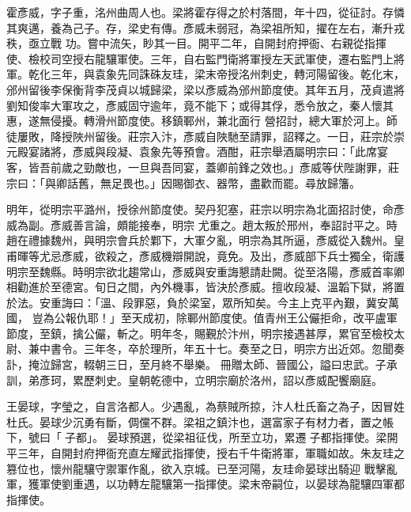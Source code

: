 
\begin{pinyinscope}

 霍彥威，字子重，洺州曲周人也。梁將霍存得之於村落間，年十四，從征討。存憐其爽邁，養為己子。存，梁史有傳。彥威未弱冠，為梁祖所知，擢在左右，漸升戎秩，亟立戰
 功。嘗中流矢，眇其一目。開平二年，自開封府押衙、右親從指揮使、檢校司空授右龍驤軍使。三年，自右監門衛將軍授左天武軍使，遷右監門上將軍。乾化三年，與袁象先同誅硃友珪，梁末帝授洺州刺史，轉河陽留後。乾化末，邠州留後李保衡背李茂貞以城歸梁，梁以彥威為邠州節度使。其年五月，茂貞遣將劉知俊率大軍攻之，彥威固守逾年，竟不能下；或得其俘，悉令放之，秦人懷其惠，遂無侵擾。轉滑州節度使。移鎮鄆州，兼北面行
 營招討，總大軍於河上。師徒屢敗，降授陜州留後。莊宗入汴，彥威自陜馳至請罪，詔釋之。一日，莊宗於崇元殿宴諸將，彥威與段凝、袁象先等預會。酒酣，莊宗舉酒屬明宗曰：「此席宴客，皆吾前歲之勁敵也，一旦與吾同宴，蓋卿前鋒之效也。」彥威等伏陛謝罪，莊宗曰：「與卿話舊，無足畏也。」因賜御衣、器幣，盡歡而罷。尋放歸籓。


明年，從明宗平潞州，授徐州節度使。契丹犯塞，莊宗以明宗為北面招討使，命彥威為副。彥威善言論，頗能接奉，明宗
 尤重之。趙太叛於邢州，奉詔討平之。時趙在禮據魏州，與明宗會兵於鄴下，大軍夕亂，明宗為其所逼，彥威從入魏州。皇甫暉等尤忌彥威，欲殺之，彥威機辯開說，竟免。及出，彥威部下兵士獨全，衛護明宗至魏縣。時明宗欲北趨常山，彥威與安重誨懇請赴闕。從至洛陽，彥威首率卿相勸進於至德宮。旬日之間，內外機事，皆決於彥威。擅收段凝、溫韜下獄，將置於法。安重誨曰：「溫、段罪惡，負於梁室，眾所知矣。今主上克平內艱，冀安萬國，
 豈為公報仇耶！」至天成初，除鄆州節度使。值青州王公儼拒命，改平盧軍節度，至鎮，擒公儼，斬之。明年冬，賜覲於汴州，明宗接遇甚厚，累官至檢校太尉、兼中書令。三年冬，卒於理所，年五十七。奏至之日，明宗方出近郊。忽聞奏訃，掩泣歸宮，輟朝三日，至月終不舉樂。
 冊贈太師、晉國公，謚曰忠武。子承訓，弟彥珂，累歷刺史。皇朝乾德中，立明宗廟於洛州，詔以彥威配饗廟庭。


王晏球，字瑩之，自言洛都人。少遇亂，為蔡賊所掠，汴人杜氏畜之為子，因冒姓杜氏。晏球少沉勇有斷，倜儻不群。梁祖之鎮汴也，選富家子有材力者，置之帳下，號曰「子都」。
 晏球預選，從梁祖征伐，所至立功，累遷子都指揮使。梁開平三年，自開封府押衙充直左耀武指揮使，授右千牛衛將軍，軍職如故。朱友珪之篡位也，懷州龍驤守禦軍作亂，欲入京城。已至河陽，友珪命晏球出騎迎
 戰擊亂軍，獲軍使劉重遇，以功轉左龍驤第一指揮使。梁末帝嗣位，以晏球為龍驤四軍都指揮使。




\end{pinyinscope}
